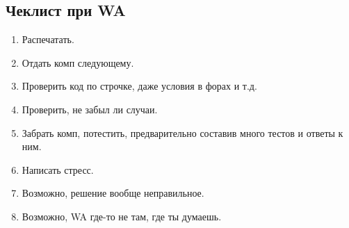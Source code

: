 \documentclass[14pt,fleqn]{article}
\begin{document}
	\subsection{Чеклист при WA}
	\begin{enumerate}[topsep=0pt,itemsep=-1ex,partopsep=1ex,parsep=1ex]
		\item Распечатать.
		\item Отдать комп следующему.
		\item Проверить код по строчке, даже условия в форах и т.д.
		\item Проверить, не забыл ли случаи.
		\item Забрать комп, потестить, предварительно составив много тестов и ответы к ним.
		\item Написать стресс.
		\item Возможно, решение вообще неправильное.
		\item Возможно, WA где-то не там, где ты думаешь.
	\end{enumerate}
\end{document}
